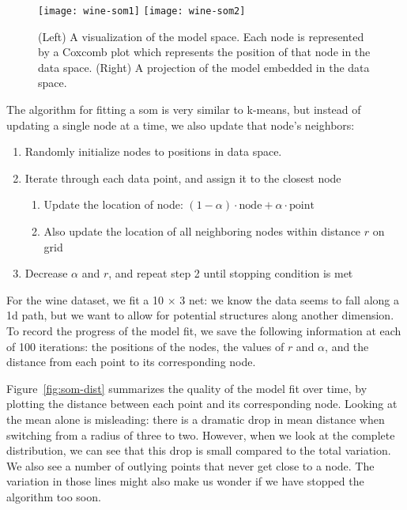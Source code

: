 \documentclass[preprint]{imsart}
\begin{document}
\begin{figure}[htb]
  \centering
    \texttt{[image: wine-som1]}
    \texttt{[image: wine-som2]}
  \caption{(Left) A visualization of the model space.  Each node is represented by a Coxcomb plot which represents the position of that node in the data space. (Right) A projection of the model embedded in the data space. }
  \label{fig:bad-fit}
\end{figure}

The algorithm for fitting a {\sc som} is very similar to k-means, but instead of updating a single node at a time, we also update that node's neighbors:

\begin{enumerate}
  \item Randomly initialize nodes to positions in data space.
  \item Iterate through each data point, and assign it to the closest node
  \begin{enumerate}
    \item Update the location of node: $(1 - \alpha) \cdot \textrm{node} + \alpha \cdot \textrm{point}$
    \item Also update the location of all neighboring nodes within distance $r$ on grid
  \end{enumerate}
  \item Decrease $\alpha$ and $r$, and repeat step 2 until stopping condition is met
\end{enumerate}

For the wine dataset, we  fit a 10 $\times$ 3 net: we know the data seems to fall along a 1d path, but  we want to allow for potential structures along another dimension.  To record the progress of the model fit, we  save the following information at each of 100 iterations: the positions of the nodes, the values of $r$ and $\alpha$, and the distance from each point to its corresponding node.

Figure~\ref{fig:som-dist} summarizes the quality of the model fit over time, by plotting the distance between each point and its corresponding node.  Looking at the mean alone is misleading: there is a dramatic drop in mean distance when switching from a radius of three to two.  However, when we look at the complete distribution, we can see that this drop is small compared to the total variation.  We also see a number of outlying points that never get close to a node.  The variation in those lines might also make us wonder if we have stopped the algorithm too soon.
\end{document}
